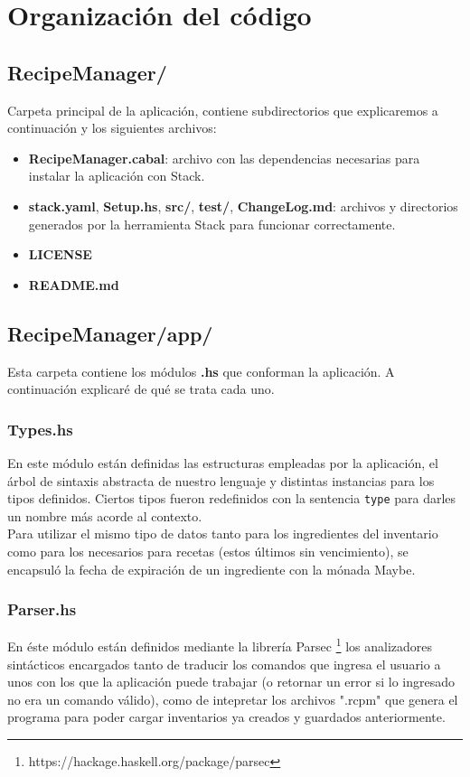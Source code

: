 \documentclass[a4paper]{article}
\begin{document}
\section*{Organización del código}

\subsection*{RecipeManager/}
Carpeta principal de la aplicación, contiene subdirectorios que explicaremos a continuación y los siguientes archivos:
\begin{itemize}
    \item \textbf{RecipeManager.cabal}: archivo con las dependencias necesarias para instalar la aplicación con Stack.
    \item \textbf{stack.yaml}, \textbf{Setup.hs}, \textbf{src/}, \textbf{test/}, \textbf{ChangeLog.md}: archivos y directorios generados por la herramienta Stack para funcionar correctamente.
    \item \textbf{LICENSE}
    \item \textbf{README.md}
\end{itemize}

\subsection*{RecipeManager/app/}
Esta carpeta contiene los módulos \textbf{.hs} que conforman la aplicación. A continuación explicaré de qué se trata cada uno.

\subsubsection*{\small{Types.hs}}
En este módulo están definidas las estructuras empleadas por la aplicación, el árbol de sintaxis abstracta de nuestro lenguaje y distintas instancias para los tipos definidos. Ciertos tipos fueron redefinidos con la sentencia \texttt{type} para darles un nombre más acorde al contexto.\\
Para utilizar el mismo tipo de datos tanto para los ingredientes del inventario como para los necesarios para recetas (estos últimos sin vencimiento), se encapsuló la fecha de expiración de un ingrediente con la mónada Maybe.

\subsubsection*{\small{Parser.hs}}
En éste módulo están definidos mediante la librería Parsec \footnote{https://hackage.haskell.org/package/parsec}
los analizadores sintácticos encargados tanto de traducir los comandos que ingresa el usuario a unos con los que la aplicación puede trabajar (o retornar un error si lo ingresado no era un comando válido), como de intepretar los archivos ".rcpm" que genera el programa para poder cargar inventarios ya creados y guardados anteriormente. 
\end{document}
